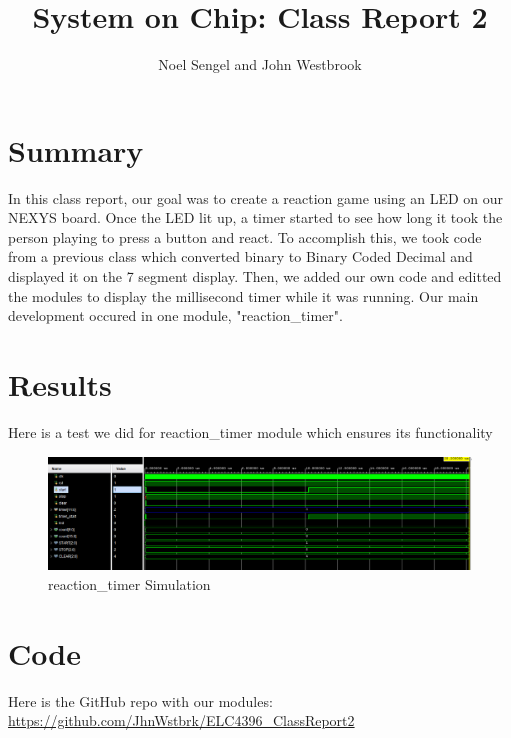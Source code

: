 \documentclass[11pt]{article}
\begin{document}
\title{System on Chip: Class Report 2}
\author{Noel Sengel and John Westbrook}

\maketitle


\section*{Summary}

In this class report, our goal was to create a reaction game using an LED on our NEXYS board. Once the LED lit up, a timer started to see how long it took the person playing to press a button and react. To accomplish this, we took code from a previous class which converted binary to Binary Coded Decimal and displayed it on the 7 segment display. Then, we added our own code and editted the modules to display the millisecond timer while it was running. Our main development occured in one module, "reaction\_timer".


\section*{Results}

Here is a test we did for reaction\_timer module which ensures its functionality
\begin{figure}[ht]\centering
	\includegraphics[width=\textwidth]{"WaveformClassReport2"}
	\caption{reaction\_timer Simulation}
	\label{fig1}
\end{figure}


\section*{Code}

Here is the GitHub repo with our modules: 
\url{https://github.com/JhnWstbrk/ELC4396_ClassReport2}
\end{document}
